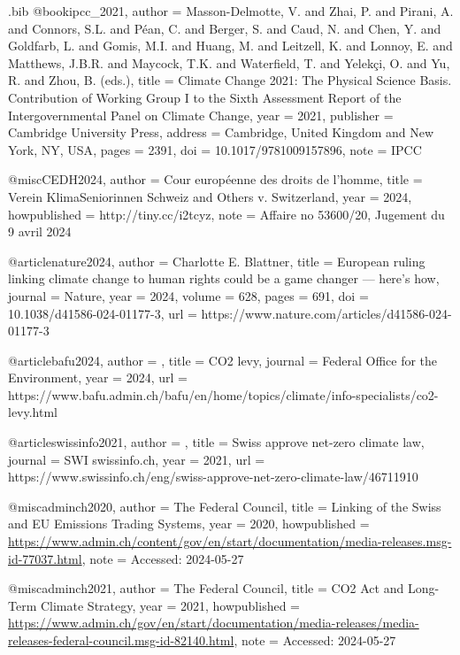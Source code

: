 \begin{filecontents}{.bib}
@book{ipcc_2021,
  author    = {Masson-Delmotte, V. and Zhai, P. and Pirani, A. and Connors, S.L. and Péan, C. and Berger, S. and Caud, N. and Chen, Y. and Goldfarb, L. and Gomis, M.I. and Huang, M. and Leitzell, K. and Lonnoy, E. and Matthews, J.B.R. and Maycock, T.K. and Waterfield, T. and Yelekçi, O. and Yu, R. and Zhou, B. (eds.)},
  title     = {Climate Change 2021: The Physical Science Basis. Contribution of Working Group I to the Sixth Assessment Report of the Intergovernmental Panel on Climate Change},
  year      = {2021},
  publisher = {Cambridge University Press},
  address   = {Cambridge, United Kingdom and New York, NY, USA},
  pages     = {2391},
  doi       = {10.1017/9781009157896},
  note      = {IPCC}
}

@misc{CEDH2024,
  author       = {{Cour européenne des droits de l'homme}},
  title        = {Verein KlimaSeniorinnen Schweiz and Others v. Switzerland},
  year         = 2024,
  howpublished = {http://tiny.cc/i2tcyz},
  note         = {Affaire no 53600/20, Jugement du 9 avril 2024}
}



@article{nature2024,
  author = {Charlotte E. Blattner},
  title = {European ruling linking climate change to human rights could be a game changer — here’s how},
  journal = {Nature},
  year = {2024},
  volume = {628},
  pages = {691},
  doi = {10.1038/d41586-024-01177-3},
  url = {https://www.nature.com/articles/d41586-024-01177-3}
}


@article{bafu2024,
  author = {},
  title = {CO2 levy},
  journal = {Federal Office for the Environment},
  year = {2024},
  url = {https://www.bafu.admin.ch/bafu/en/home/topics/climate/info-specialists/co2-levy.html}
}

@article{swissinfo2021,
  author = {},
  title = {Swiss approve net-zero climate law},
  journal = {SWI swissinfo.ch},
  year = {2021},
  url = {https://www.swissinfo.ch/eng/swiss-approve-net-zero-climate-law/46711910}
}


@misc{adminch2020,
  author       = {{The Federal Council}},
  title        = {Linking of the Swiss and EU Emissions Trading Systems},
  year         = 2020,
  howpublished = {\url{https://www.admin.ch/content/gov/en/start/documentation/media-releases.msg-id-77037.html}},
  note         = {Accessed: 2024-05-27}
}


@misc{adminch2021,
  author       = {{The Federal Council}},
  title        = {CO2 Act and Long-Term Climate Strategy},
  year         = 2021,
  howpublished = {\url{https://www.admin.ch/gov/en/start/documentation/media-releases/media-releases-federal-council.msg-id-82140.html}},
  note         = {Accessed: 2024-05-27}
}



\end{filecontents}
